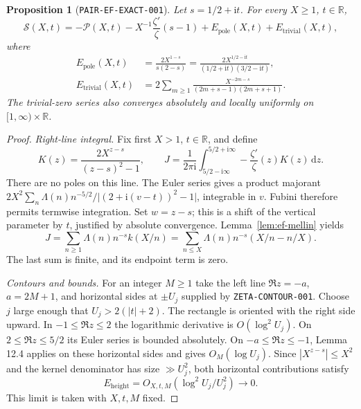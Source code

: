 \documentclass[11pt]{article}
\newtheorem{proposition}[lemma]{Proposition}
\newcommand{\dd}{\,\mathrm d}
\newcommand{\ii}{\mathrm i}
\newcommand{\ZL}{\frac{\zeta'}{\zeta}}
\newcommand{\ZS}{\mathcal S}
\newcommand{\PS}{\mathcal P}
\newcommand{\EP}{E_{\mathrm{pole}}}
\newcommand{\ET}{E_{\mathrm{trivial}}}
\begin{document}
\begin{proposition}[\texttt{PAIR-EF-EXACT-001}]\label{prop:ef-exact}
Let \(s=1/2+\ii t\). For every \(X\geq1\), \(t\in\mathbb R\),
\begin{equation}\label{eq:exact}
 \ZS(X,t)=-\PS(X,t)-X^{-1}\ZL(s-1)+\EP(X,t)+\ET(X,t),
\end{equation}
where
\begin{align}
 \EP(X,t)&=\frac{2X^{1-s}}{s(2-s)}
       =\frac{2X^{1/2-\ii t}}{(1/2+\ii t)(3/2-\ii t)},
       \label{eq:pole}\\
 \ET(X,t)&=2\sum_{m\geq1}
 \frac{X^{-2m-s}}{(2m+s-1)(2m+s+1)}.\label{eq:trivial}
\end{align}
The trivial-zero series also converges absolutely and locally uniformly
on \([1,\infty)\times\mathbb R\).
\end{proposition}
\begin{proof}
\textit{Right-line integral.}
Fix first \(X>1\), \(t\in\mathbb R\), and define
\[
 K(z)=\frac{2X^{z-s}}{(z-s)^2-1},\qquad
 J=\frac1{2\pi\ii}\int_{5/2-\ii\infty}^{5/2+\ii\infty}
                    -\ZL(z)K(z)\dd z.
\]
There are no poles on this line. The Euler series gives a product
majorant \(2X^2\sum_n\Lambda(n)n^{-5/2}
/\lvert(2+\ii(v-t))^2-1\rvert\), integrable in \(v\).
Fubini therefore permits termwise integration. Set \(w=z-s\);
this is a shift of the vertical parameter by \(t\), justified by
absolute convergence. Lemma~\ref{lem:ef-mellin} yields
\begin{equation}\label{eq:right-line}
 J=\sum_{n\geq1}\Lambda(n)n^{-s}k(X/n)
  =\sum_{n\leq X}\Lambda(n)n^{-s}(X/n-n/X).
\end{equation}
The last sum is finite, and its endpoint term is zero.

\textit{Contours and bounds.}
For an integer \(M\geq1\) take the left line \(\Re z=-a\),
\(a=2M+1\), and horizontal sides at \(\pm U_j\) supplied by
\texttt{ZETA-CONTOUR-001}. Choose \(j\) large enough that
\(U_j>2(|t|+2)\). The rectangle is oriented with the right side
upward. In \(-1\leq\Re z\leq2\) the logarithmic derivative is
\(O(\log^2 U_j)\). On \(2\leq\Re z\leq5/2\) its Euler series
is bounded absolutely. On \(-a\leq\Re z\leq-1\), Lemma 12.4
applies on these horizontal sides and gives \(O_M(\log U_j)\).
Since \(|X^{z-s}|\leq X^2\) and the kernel denominator has size
\(\gg U_j^2\), both horizontal contributions satisfy
\begin{equation}\label{eq:horizontal-error}
 E_{\mathrm{height}}=O_{X,t,M}(\log^2 U_j/U_j^2)\longrightarrow0.
\end{equation}
This limit is taken with \(X,t,M\) fixed.


\end{proof}
\end{document}
